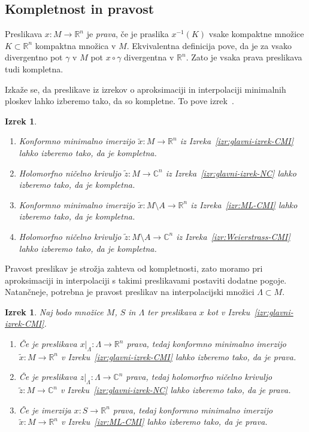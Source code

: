 \documentclass[12pt,a4paper,twoside]{article}
\theoremstyle{definition} %
\theoremstyle{plain} %
\newtheorem{izrek}[definicija]{Izrek}
\numberwithin{equation}{section}  %
\newcommand{\R}{\mathbb R}
\newcommand{\C}{\mathbb C}
\begin{document}
\subsection{Kompletnost in pravost}
%
Preslikava $x \colon M \to \R^{n}$ je \emph{prava}, če je praslika $x^{-1}(K)$ vsake kompaktne množice $K \subset \R^{n}$ kompaktna množica v $M$.
Ekvivalentna definicija pove, da je za vsako divergentno pot $\gamma$ v $M$ pot $x \circ \gamma$ divergentna v $\R^{n}$. Zato je vsaka prava preslikava tudi kompletna.

Izkaže se, da preslikave iz izrekov o aproksimaciji in interpolaciji minimalnih ploskev lahko izberemo tako, da so kompletne. To pove izrek~\cite[Theorem~3.9.1]{alarcon2021minimal}.

\begin{izrek} \label{izr:kompletnost}
\begin{enumerate}
\item Konformno minimalno imerzijo $\tilde{x} \colon M \to \R^{n}$ iz Izreka~\ref{izr:glavni-izrek-CMI} lahko izberemo tako, da je kompletna.
\item Holomorfno ničelno krivuljo $\tilde{z} \colon M \to \C^{n}$ iz Izreka~\ref{izr:glavni-izrek-NC} lahko izberemo tako, da je kompletna.
\item Konformno minimalno imerzijo $\tilde{x} \colon M \setminus A \to \R^{n}$ iz Izreka~\ref{izr:ML-CMI} lahko izberemo tako, da je kompletna.
\item Holomorfno ničelno krivuljo $\tilde{z} \colon M \setminus A \to \C^{n}$ iz Izreka~\ref{izr:Weierstrass-CMI} lahko izberemo tako, da je kompletna.
\end{enumerate}
\end{izrek}

Pravost preslikav je strožja zahteva od kompletnosti, zato moramo pri aproksimaciji in interpolaciji s takimi preslikavami postaviti dodatne pogoje. Natančneje, potrebna je pravost preslikav na interpolacijski množici $\Lambda \subset M$.

\begin{izrek} \label{izr:pravost}
Naj bodo množice $M$, $S$ in $\Lambda$ ter preslikava $x$ kot v Izreku~\ref{izr:glavni-izrek-CMI}.
\begin{enumerate}
\item Če je preslikava $x|_{\Lambda} \colon \Lambda \to \R^{n}$ prava, tedaj konformno minimalno imerzijo $\tilde{x} \colon M \to \R^{n}$ v Izreku~\ref{izr:glavni-izrek-CMI} lahko izberemo tako, da je prava.
\item Če je preslikava $z|_{\Lambda} \colon \Lambda \to \C^{n}$ prava, tedaj holomorfno ničelno krivuljo $\tilde{z} \colon M \to \C^{n}$ v Izreku~\ref{izr:glavni-izrek-NC} lahko izberemo tako, da je prava.
\item Če je imerzija $x \colon S \to \R^{n}$ prava, tedaj konformno minimalno imerzijo $\tilde{x} \colon M \to \R^{n}$ v Izreku~\ref{izr:ML-CMI} lahko izberemo tako, da je prava.
\end{enumerate}
\end{izrek}
\end{document}
